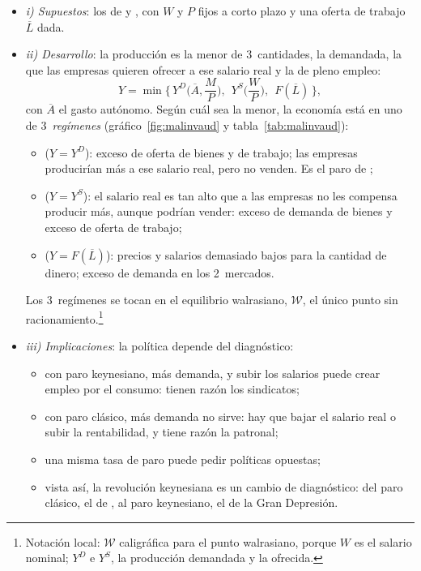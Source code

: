 \documentclass[11pt]{article}
\begin{document}
\begin{itemize}
\item \emph{i) Supuestos}: los de  y , con $W$ y $P$ fijos a corto plazo y una oferta de trabajo $\overline{L}$ dada.
\item \emph{ii) Desarrollo}: la producción es la menor de 3~cantidades, la demandada, la que las empresas quieren ofrecer a ese salario real y la de pleno empleo:
  \begin{equation}
  Y=\min\Big\{\,Y^{D}\Big(\overline{A},\frac{M}{P}\Big),\ \ Y^{S}\Big(\frac{W}{P}\Big),\ \ F(\overline{L})\,\Big\}, \label{eq:malinvaud}
  \end{equation}
  con $\overline{A}$ el gasto autónomo. Según cuál sea la menor, la economía está en uno de 3~\emph{regímenes} (gráfico~\ref{fig:malinvaud} y tabla~\ref{tab:malinvaud}):
  \begin{itemize}
  \item {} ($Y=Y^D$): exceso de oferta de bienes y de trabajo; las empresas producirían más a ese salario real, pero no venden. Es el paro de ;
  \item {} ($Y=Y^S$): el salario real es tan alto que a las empresas no les compensa producir más, aunque podrían vender: exceso de demanda de bienes y exceso de oferta de trabajo;
  \item {} ($Y=F(\overline{L})$): precios y salarios demasiado bajos para la cantidad de dinero; exceso de demanda en los 2~mercados.
  \end{itemize}
  Los 3~regímenes se tocan en el equilibrio walrasiano, $\mathcal{W}$, el único punto sin racionamiento.\footnote{Notación local: $\mathcal{W}$ caligráfica para el punto walrasiano, porque $W$ es el salario nominal; $Y^D$ e $Y^S$, la producción demandada y la ofrecida.}
\item \emph{iii) Implicaciones}: la política depende del diagnóstico:
  \begin{itemize}
  \item con paro keynesiano, más demanda, y subir los salarios puede crear empleo por el consumo: tienen razón los sindicatos;
  \item con paro clásico, más demanda no sirve: hay que bajar el salario real o subir la rentabilidad, y tiene razón la patronal;
  \item una misma tasa de paro puede pedir políticas opuestas;
  \item vista así, la revolución keynesiana es un cambio de diagnóstico: del paro clásico, el de , al paro keynesiano, el de la Gran Depresión.
  \end{itemize}
\end{itemize}
\end{document}
